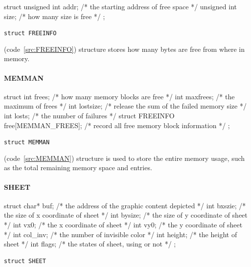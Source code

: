 \documentclass{swfcthesis}
\begin{document}
\begin{listing}[H]
  \begin{codeblock}
\begin{ccode}
struct 
{ 
  unsigned int addr; /* the starting address of free space */
  unsigned int size; /* how many size is free */
};
\end{ccode}
  \end{codeblock}
  \caption{\texttt{struct FREEINFO}}\label{src:FREEINFO}
\end{listing}

(code~\ref{src:FREEINFO}) structure stores how many bytes are
free from where in memory.




\paragraph{MEMMAN}

\begin{listing}[H]
  \begin{codeblock}
\begin{ccode}
struct 
{ 
  int frees;                           /* how many memory blocks are free */
  int maxfrees;                        /* the maximum of frees */
  int lostsize;                        /* release the sum of the failed memory size */
  int losts;                           /* the number of failures */
  struct FREEINFO free[MEMMAN_FREES];  /* record all free memory block information */
};
\end{ccode}
  \end{codeblock}
  \caption{\texttt{struct MEMMAN}}\label{src:MEMMAN}
\end{listing}

(code~\ref{src:MEMMAN}) structure is used to store the entire memory usage, such as the total
remaining memory space and entries.



\paragraph{SHEET}

\begin{listing}[H]
  \begin{codeblock}
\begin{ccode}
struct 
{ 
  char* buf;   /* the address of the graphic content depicted */
  int bxszie;  /* the size of x coordinate of sheet */
  int bysize;  /* the size of y coordinate of sheet */
  int vx0;     /* the x coordinate of sheet */
  int vy0;     /* the y coordinate of sheet */
  int col_inv; /* the number of invisible color */
  int height;  /* the height of sheet */
  int flags;   /* the states of sheet, using or not */
};
\end{ccode}
  \end{codeblock}
  \caption{\texttt{struct SHEET}}\label{src:SHEET}
\end{listing}
\end{document}
